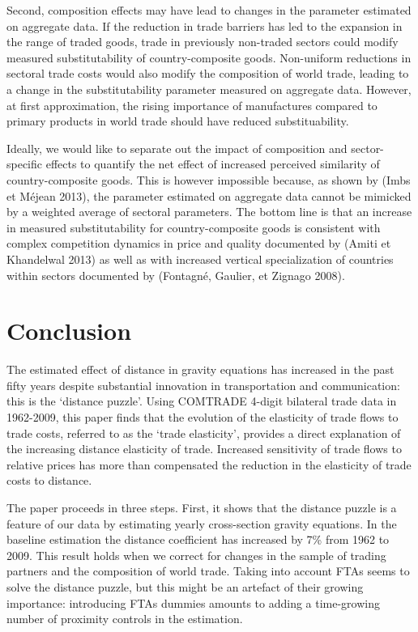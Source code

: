 \documentclass[12pt,twoside,a4paper,notitlepage]{article}
\begin{document}
{Second, composition effects may have lead to changes in the parameter estimated on aggregate data.
If the reduction in trade barriers has led to the expansion in the range of traded goods, trade in previously non-traded sectors could modify measured substitutability of country-composite goods.
Non-uniform reductions in sectoral trade costs would also modify the composition of world trade, leading to a change in the substitutability parameter measured on aggregate data.
However, at first approximation, the rising importance of manufactures compared to primary products in world trade should have reduced substituability.

Ideally, we would like to separate out the impact of composition and sector-specific effects to quantify the net effect of increased perceived similarity of country-composite goods.
This is however impossible because, as shown by (Imbs et M\'{e}jean 2013), the parameter estimated on aggregate data cannot be mimicked by a weighted average of sectoral parameters.
The bottom line is that an increase in measured substitutability for country-composite goods is consistent with complex competition dynamics in price and quality documented by (Amiti et Khandelwal 2013) as well as with increased vertical specialization of countries within sectors documented by (Fontagn\'{e}, Gaulier, et Zignago 2008).

\section{Conclusion}

The estimated effect of distance in gravity equations has increased in the past fifty years despite substantial innovation in transportation and communication: this is the `distance puzzle'.
Using COMTRADE 4-digit bilateral trade data in 1962-2009, this paper finds that the evolution of the elasticity of trade flows to trade costs, referred to as the `trade elasticity', provides a direct explanation of the increasing distance elasticity of trade.
Increased sensitivity of trade flows to relative prices has more than compensated the reduction in the elasticity of trade costs to distance.

The paper proceeds in three steps.
First, it shows that the distance puzzle is a feature of our data by estimating yearly cross-section gravity equations.
In the baseline estimation the distance coefficient has increased by 7\% from 1962 to 2009.
This result holds when we correct for changes in the sample of trading partners and the composition of world trade.
Taking into account FTAs seems to solve the distance puzzle, but this might be an artefact of their growing importance: introducing FTAs dummies amounts to adding a time-growing number of proximity controls in the estimation.

}
\end{document}
